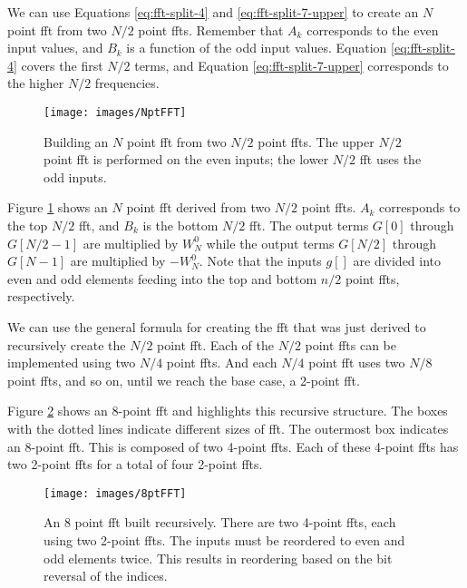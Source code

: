 We can use Equations \ref{eq:fft-split-4} and \ref{eq:fft-split-7-upper} to create an $N$ point \gls{fft} from two $N/2$ point \gls{fft}s. Remember that $A_k$ corresponds to the even input values, and $B_k$ is a function of the odd input values. Equation \ref{eq:fft-split-4} covers the first $N/2$ terms, and Equation \ref{eq:fft-split-7-upper} corresponds to the higher $N/2$ frequencies. 

\begin{figure}
\centering
\texttt{[image: images/NptFFT]}
\caption{Building an $N$ point \gls{fft} from two $N/2$ point \gls{fft}s. The upper $N/2$ point \gls{fft} is performed on the even inputs; the lower $N/2$ \gls{fft} uses the odd inputs. }
\label{fig:NptFFT}
\end{figure}

Figure \ref{fig:NptFFT} shows an $N$ point \gls{fft} derived from two $N/2$ point \gls{fft}s. $A_k$ corresponds to the top $N/2$ \gls{fft}, and $B_k$ is the bottom $N/2$ \gls{fft}.  The output terms $G[0]$ through $G[N/2-1]$ are multiplied by $W_N^0$ while the output terms $G[N/2]$ through $G[N-1]$ are multiplied by $-W_N^0$. Note that the inputs $g[]$ are divided into even and odd elements feeding into the top and bottom $n/2$ point \gls{fft}s, respectively.

We can use the general formula for creating the \gls{fft} that was just derived to recursively create the $N/2$ point \gls{fft}. Each of the $N/2$ point \gls{fft}s can be implemented using two $N/4$ point \gls{fft}s. And each $N/4$ point \gls{fft} uses two $N/8$ point \gls{fft}s, and so on, until we reach the base case, a 2-point \gls{fft}.

Figure \ref{fig:8ptFFT} shows an 8-point \gls{fft} and highlights this recursive structure. The boxes with the dotted lines indicate different sizes of \gls{fft}. The outermost box indicates an 8-point \gls{fft}. This is composed of two 4-point \gls{fft}s. Each of these 4-point \gls{fft}s has two 2-point \gls{fft}s for a total of four 2-point \gls{fft}s. 

\begin{figure}
\centering
\texttt{[image: images/8ptFFT]}
\caption{An 8 point \gls{fft} built recursively. There are two 4-point \gls{fft}s, each using two 2-point \gls{fft}s. The inputs must be reordered to even and odd elements twice. This results in reordering based on the bit reversal of the indices.}
\label{fig:8ptFFT}
\end{figure}

